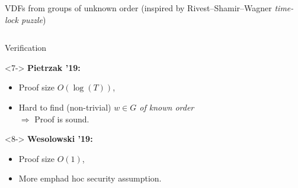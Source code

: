 \documentclass[aspectratio=169]{beamer}
\begin{document}
\begin{frame}{VDFs from groups of unknown order
    {\small (inspired by Rivest--Shamir--Wagner \emph{time-lock puzzle})}}
\begin{columns}
\begin{column}{0.37\textwidth}
{\begin{block}{Verification}
          \smallskip
          \begin{uncoverenv}<7->
            \textbf{Pietrzak '19:}
            \begin{itemize}
            \item Proof size \emph{$O(\log(T))$},
            \item Hard to find (non-trivial) \emph{$w\in G$ of known order}\\
              $\Rightarrow$ Proof is sound.
            \end{itemize}
          \end{uncoverenv}

          \smallskip
          \begin{uncoverenv}<8->
            \textbf{Wesolowski '19:}
            \begin{itemize}
            \item Proof size \emph{$O(1)$},
            \item More emph{ad hoc} security assumption.
            \end{itemize}
          \end{uncoverenv}
        \end{block}
      }
    \end{column}
  \end{columns}
\end{frame}

\end{document}
